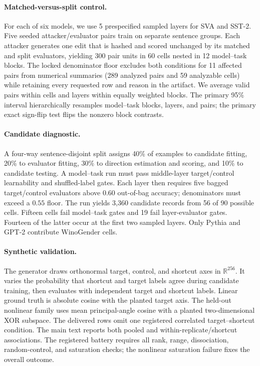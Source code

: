 \documentclass{article}
\begin{document}
\paragraph{Matched-versus-split control.}
For each of six models, we use 5 prespecified sampled layers for SVA and SST-2. Five seeded attacker/evaluator pairs train on separate sentence groups. Each attacker generates one edit that is hashed and scored unchanged by its matched and split evaluators, yielding 300 pair units in 60 cells nested in 12 model--task blocks. The locked denominator floor excludes both conditions for 11 affected pairs from numerical summaries (289 analyzed pairs and 59 analyzable cells) while retaining every requested row and reason in the artifact. We average valid pairs within cells and layers within equally weighted blocks. The primary 95\% interval hierarchically resamples model--task blocks, layers, and pairs; the primary exact sign-flip test flips the nonzero block contrasts.

\paragraph{Candidate diagnostic.}
A four-way sentence-disjoint split assigns 40\% of examples to candidate fitting, 20\% to evaluator fitting, 30\% to direction estimation and scoring, and 10\% to candidate testing. A model--task run must pass middle-layer target/control learnability and shuffled-label gates. Each layer then requires five bagged target/control evaluators above $0.60$ out-of-bag accuracy; denominators must exceed a $0.55$ floor. The run yields 3,360 candidate records from 56 of 90 possible cells. Fifteen cells fail model--task gates and 19 fail layer-evaluator gates. Fourteen of the latter occur at the first two sampled layers. Only Pythia and GPT-2 contribute WinoGender cells.

\paragraph{Synthetic validation.}
The generator draws orthonormal target, control, and shortcut axes in $\mathbb R^{256}$. It varies the probability that shortcut and target labels agree during candidate training, then evaluates with independent target and shortcut labels. Linear ground truth is absolute cosine with the planted target axis. The held-out nonlinear family uses mean principal-angle cosine with a planted two-dimensional XOR subspace. The delivered rows omit one registered correlated target--shortcut condition. The main text reports both pooled and within-replicate/shortcut associations. The registered battery requires all rank, range, dissociation, random-control, and saturation checks; the nonlinear saturation failure fixes the overall outcome.
\end{document}
